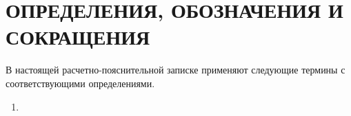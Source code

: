 \section*{\large ОПРЕДЕЛЕНИЯ, ОБОЗНАЧЕНИЯ И СОКРАЩЕНИЯ}

В настоящей расчетно-пояснительной записке применяют следующие термины с соответствующими определениями.


\begin{enumerate}
	\item 
\end{enumerate}
\pagebreak